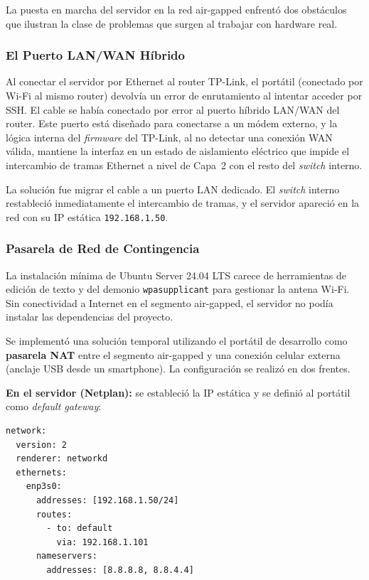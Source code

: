 La puesta en marcha del servidor en la red air-gapped enfrentó dos obstáculos que ilustran la clase de problemas que surgen al trabajar con hardware real.

\subsubsection{El Puerto LAN/WAN Híbrido}

Al conectar el servidor por Ethernet al router TP-Link, el portátil (conectado por Wi-Fi al mismo router) devolvía un error de enrutamiento al intentar acceder por SSH. El cable se había conectado por error al puerto híbrido LAN/WAN del router. Este puerto está diseñado para conectarse a un módem externo, y la lógica interna del \textit{firmware} del TP-Link, al no detectar una conexión WAN válida, mantiene la interfaz en un estado de aislamiento eléctrico que impide el intercambio de tramas Ethernet a nivel de Capa~2 con el resto del \textit{switch} interno.

La solución fue migrar el cable a un puerto LAN dedicado. El \textit{switch} interno restableció inmediatamente el intercambio de tramas, y el servidor apareció en la red con su IP estática \texttt{192.168.1.50}.

\subsubsection{Pasarela de Red de Contingencia}

La instalación mínima de Ubuntu Server 24.04 LTS carece de herramientas de edición de texto y del demonio \texttt{wpasupplicant} para gestionar la antena Wi-Fi. Sin conectividad a Internet en el segmento air-gapped, el servidor no podía instalar las dependencias del proyecto.

Se implementó una solución temporal utilizando el portátil de desarrollo como \textbf{pasarela NAT} entre el segmento air-gapped y una conexión celular externa (anclaje USB desde un smartphone). La configuración se realizó en dos frentes.

\textbf{En el servidor (Netplan):} se estableció la IP estática y se definió al portátil como \textit{default gateway}:

\begin{verbatim}
network:
  version: 2
  renderer: networkd
  ethernets:
    enp3s0:
      addresses: [192.168.1.50/24]
      routes:
        - to: default
          via: 192.168.1.101
      nameservers:
        addresses: [8.8.8.8, 8.8.4.4]
\end{verbatim}

